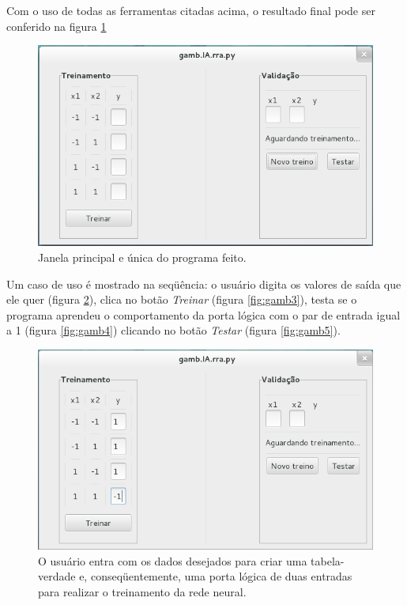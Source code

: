 \documentclass[11pt]{article}
\begin{document}
Com o uso de todas as ferramentas citadas acima, o resultado final pode ser conferido na figura \ref{fig:gamb1}

\begin{figure}[h]
\begin{center}
\includegraphics[scale=0.6]{figuras/gamb1}
\caption{Janela principal e única do programa feito.}\label{fig:gamb1}
\end{center}
\end{figure}

Um caso de uso é mostrado na seqüência: o usuário digita os valores de saída que ele quer (figura \ref{fig:gamb2}), clica no botão \emph{Treinar} (figura \ref{fig:gamb3}), testa se o programa aprendeu o comportamento da porta lógica com o par de entrada igual a 1 (figura \ref{fig:gamb4}) clicando no botão \emph{Testar} (figura \ref{fig:gamb5}).

\begin{figure}[p]
\begin{center}
\includegraphics[scale=0.6]{figuras/gamb2}
\caption{O usuário entra com os dados desejados para criar uma tabela-verdade e, conseqüentemente, uma porta lógica de duas entradas para realizar o treinamento da rede neural.}\label{fig:gamb2}
\end{center}
\end{figure}
\end{document}
